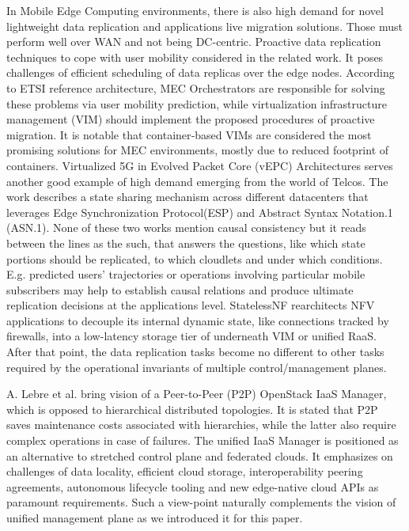 \documentclass[conference]{IEEEtran}
\begin{document}
In Mobile Edge Computing environments, there is also high demand for novel
lightweight data replication and applications live migration solutions. Those
must perform well over WAN and not being DC-centric. Proactive data replication
techniques to cope with user mobility considered in the related work\cite{b14}.
It poses challenges of efficient scheduling of data replicas over the edge
nodes. According to ETSI reference architecture, MEC Orchestrators are
responsible for solving these problems via user mobility prediction, while
virtualization infrastructure management (VIM) should implement the proposed
procedures of proactive migration. It is notable that container‐based VIMs are
considered the most promising solutions for MEC environments, mostly due to
reduced footprint of containers. Virtualized 5G in Evolved Packet Core (vEPC)
Architectures\cite{b15} serves another good example of high demand emerging
from the world of Telcos. The work describes a state sharing mechanism across
different datacenters that leverages Edge Synchronization Protocol(ESP) and
Abstract Syntax Notation.1 (ASN.1). None of these two works mention
causal consistency but it reads between the lines as the such, that answers the
questions, like which state portions should be replicated, to which cloudlets
and under which conditions. E.g. predicted users' trajectories or operations
involving particular mobile subscribers may help to establish causal relations
and produce ultimate replication decisions at the applications level.
StatelessNF\cite{b16} rearchitects NFV applications to decouple its internal
dynamic state, like connections tracked by firewalls, into a low-latency
storage tier of underneath VIM or unified RaaS. After that point, the data
replication tasks become no different to other tasks required by the operational
invariants of multiple control/management planes.

A. Lebre et al.\cite{b9} bring vision of a Peer-to-Peer (P2P) OpenStack IaaS
Manager, which is opposed to hierarchical distributed topologies. It is stated
that P2P saves maintenance costs associated with hierarchies, while the latter
also require complex operations in case of failures. The unified IaaS Manager
is positioned as an alternative to stretched control plane and federated
clouds. It emphasizes on challenges of data locality, efficient cloud storage,
interoperability peering agreements, autonomous lifecycle tooling and new
edge-native cloud APIs as paramount requirements. Such a view-point naturally
complements the vision of unified management plane as we introduced it for this
paper.
\end{document}
